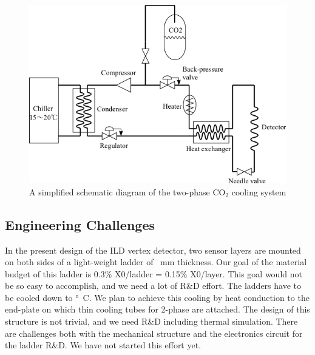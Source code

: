 \begin{figure}
    \includegraphics[width=\textwidth]{VertexDetector/FPCCD/coolingSystemSchematic.png}
    \caption{A simplified schematic diagram of the two-phase $\text{CO}_2$ cooling system}
    \label{fig:FPCCD:coolingSystemSchematic}
\end{figure}

\subsection{Engineering Challenges}
    In the present design of the ILD vertex detector, two sensor layers are mounted on both sides of a light-weight ladder of ~\unit[2]{mm} thickness. Our goal of the material budget of this ladder is 0.3\% X0/ladder = 0.15\% X0/layer. This goal would not be so easy to accomplish, and we need a lot of R\&D effort.
    The ladders have to be cooled down to \unit[-40]{\degree C}. We plan to achieve this cooling by heat conduction to the end-plate on which thin cooling tubes for 2-phase  are attached. The design of this structure is not trivial, and we need R\&D including thermal simulation.
    There are challenges both with the mechanical structure and the electronics circuit for the ladder R\&D. We have not started this effort yet.
